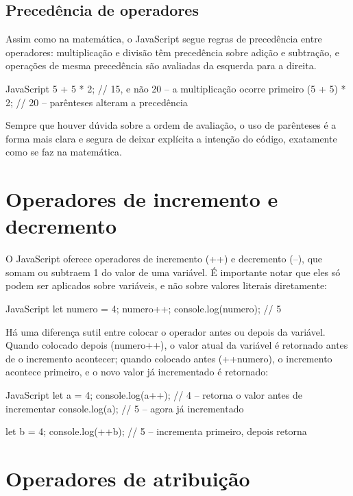 \subsection{Precedência de operadores}

Assim como na matemática, o JavaScript segue regras de precedência entre operadores: multiplicação e divisão têm precedência sobre adição e subtração, e operações de mesma precedência são avaliadas da esquerda para a direita.

\begin{codebox}{JavaScript}
5 + 5 * 2;   // 15, e não 20 -- a multiplicação ocorre primeiro
(5 + 5) * 2; // 20 -- parênteses alteram a precedência
\end{codebox}

Sempre que houver dúvida sobre a ordem de avaliação, o uso de parênteses é a forma mais clara e segura de deixar explícita a intenção do código, exatamente como se faz na matemática.

\section{Operadores de incremento e decremento}

O JavaScript oferece operadores de incremento (++) e decremento (--), que somam ou subtraem 1 do valor de uma variável. É importante notar que eles só podem ser aplicados sobre variáveis, e não sobre valores literais diretamente:

\begin{codebox}{JavaScript}
let numero = 4;
numero++;
console.log(numero); // 5
\end{codebox}

Há uma diferença sutil entre colocar o operador antes ou depois da variável. Quando colocado depois (numero++), o valor atual da variável é retornado antes de o incremento acontecer; quando colocado antes (++numero), o incremento acontece primeiro, e o novo valor já incrementado é retornado:

\begin{codebox}{JavaScript}
let a = 4;
console.log(a++); // 4 -- retorna o valor antes de incrementar
console.log(a);   // 5 -- agora já incrementado

let b = 4;
console.log(++b); // 5 -- incrementa primeiro, depois retorna
\end{codebox}

\section{Operadores de atribuição}

